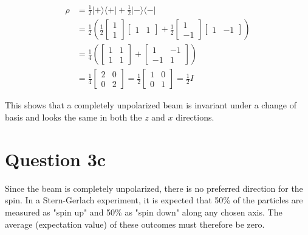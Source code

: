 \documentclass{article}
\begin{document}
\begin{align*}
\rho &= \frac{1}{2} |+\rangle\langle+| + \frac{1}{2} |-\rangle\langle-| \\
&= \frac{1}{2} \left( \frac{1}{2} \begin{bmatrix} 1 \\ 1 \end{bmatrix} \begin{bmatrix} 1 & 1 \end{bmatrix} + \frac{1}{2} \begin{bmatrix} 1 \\ -1 \end{bmatrix} \begin{bmatrix} 1 & -1 \end{bmatrix} \right) \\
&= \frac{1}{4} \left( \begin{bmatrix} 1 & 1 \\ 1 & 1 \end{bmatrix} + \begin{bmatrix} 1 & -1 \\ -1 & 1 \end{bmatrix} \right) \\
&= \frac{1}{4} \begin{bmatrix} 2 & 0 \\ 0 & 2 \end{bmatrix} = \frac{1}{2} \begin{bmatrix} 1 & 0 \\ 0 & 1 \end{bmatrix} = \frac{1}{2} I
\end{align*}

This shows that a completely unpolarized beam is invariant under a change of basis and looks the same in both the $z$ and $x$ directions.

\section*{Question 3c}

Since the beam is completely unpolarized, there is no preferred direction for the spin. In a Stern-Gerlach experiment, it is expected that 50\% of the particles are measured as "spin up" and 50\% as "spin down" along any chosen axis. The average (expectation value) of these outcomes must therefore be zero.
\end{document}
